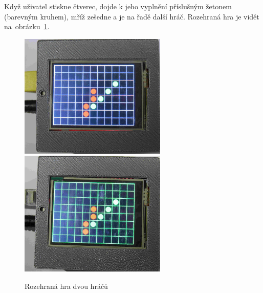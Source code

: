 \begin{enumerate}
Když uživatel stiskne čtverec, dojde k jeho vyplnění příslušným žetonem (barevným kruhem), mříž zešedne a je na řadě další hráč. Rozehraná hra je vidět na~obrázku~\ref{fig:faze5}.
\begin{figure}[H]
\centering
\includegraphics[width=7cm, angle=0]{img/gameFlow/phase05a.jpg}
\includegraphics[width=7cm, angle=0]{img/gameFlow/phase05b.jpg}
\caption{\label{fig:faze5} Rozehraná hra dvou hráčů}
\end{figure}


\end{enumerate}
